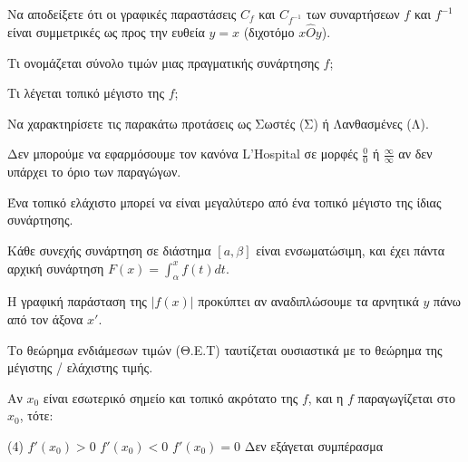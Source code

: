 \documentclass[11pt,a4paper]{article}
\newcommand{\kerkissans}[1]{{\fontfamily{maksf}\selectfont \textbf{#1}}}
\renewcommand{\textdexiakeraia}{}
\newcommand{\dint}{\displaystyle\int}
\newcommand\themanum{A}
\newcounter{thema}[section]
\renewcommand{\thethema}{\arabic{thema}}
\newcommand{\Thema}{\refstepcounter{thema}{\textbf{\textcolor{black}{\faPenSquare\ \  \large \kerkissans{\textbf{\thethemaο\hspace{2mm}Θέμα}}}}}\hspace{0mm}}{}
\newenvironment{thema}[1]
{\begin{tcolorbox}[title=\Thema\kerkissans{\textbf{\large{  #1}}},breakable,
enhanced standard,titlerule=0pt,toprule=0pt, rightrule=0pt, bottomrule=0pt,
colback=white,left=0mm,top=1mm,bottom=0mm,
boxrule=0pt,
colframe=white,leftrule=0mm,sharp corners,coltitle=black]
\renewcommand{\themanum}{#1}}
{\end{tcolorbox}}
\begin{document}
\begin{thema}{A}
\begin{erwthma}
    \item Να αποδείξετε ότι οι γραφικές παραστάσεις $ C_f $ και $ C_{f^{-1}} $ των συναρτήσεων $ f $ και $ f^{-1} $ είναι συμμετρικές ως προς την ευθεία $ y=x $ (διχοτόμο $x\hat{O}y$).
    \item Τι ονομάζεται σύνολο τιμών μιας πραγματικής συνάρτησης $f$;
    \item Τι λέγεται τοπικό μέγιστο της $f$;
    \item Να χαρακτηρίσετε τις παρακάτω προτάσεις ως Σωστές (Σ) ή Λανθασμένες (Λ).
    \begin{alist}
        \item Δεν μπορούμε να εφαρμόσουμε τον κανόνα L'Hospital σε μορφές $\frac{0}{0}$ ή $\frac{\infty}{\infty}$ αν δεν υπάρχει το όριο των παραγώγων.
        \item Ένα τοπικό ελάχιστο μπορεί να είναι μεγαλύτερο από ένα τοπικό μέγιστο της ίδιας συνάρτησης.
        \item Κάθε συνεχής συνάρτηση σε διάστημα $[a,\beta]$ είναι ενσωματώσιμη, και έχει πάντα αρχική συνάρτηση $F(x) = \dint_\alpha^x f(t) dt$.
        \item Η γραφική παράσταση της $|f(x)|$ προκύπτει αν αναδιπλώσουμε τα αρνητικά $y$ πάνω από τον άξονα $x'$.
        \item Το θεώρημα ενδιάμεσων τιμών (Θ.Ε.Τ) ταυτίζεται ουσιαστικά με το θεώρημα της μέγιστης / ελάχιστης τιμής.
    \end{alist}
    \item Αν $x_0$ είναι εσωτερικό σημείο και τοπικό ακρότατο της $f$, και η $f$ παραγωγίζεται στο $x_0$, τότε:
    \begin{tasks}[label=\let\textdexiakeraia\relax\alph*.](4)
        \task $f'(x_0) > 0$
        \task $f'(x_0) < 0$
        \task $f'(x_0) = 0$
        \task Δεν εξάγεται συμπέρασμα
    \end{tasks}
\end{erwthma}
\end{thema}
\end{document}
